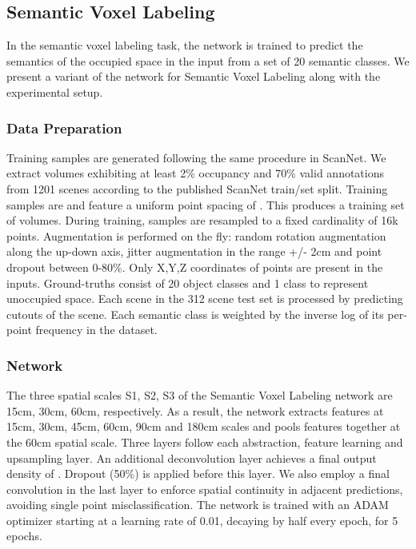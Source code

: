 \documentclass[runningheads]{llncs}
\begin{document}
\subsection{Semantic Voxel Labeling}
\label{section:EvalSVL}

In the semantic voxel labeling task, the network is trained to predict the semantics of the occupied space in the input from a set of 20 semantic classes. We present a variant of the network for Semantic Voxel Labeling along with the experimental setup. 

\subsubsection{Data Preparation}

Training samples are generated following the same procedure in ScanNet. We extract volumes exhibiting at least 2\% occupancy and 70\% valid annotations from 1201 scenes according to the published ScanNet train/set split. Training samples are  and feature a uniform point spacing of . This produces a training set of  volumes. During training, samples are resampled to a fixed cardinality of 16k points. Augmentation is performed on the fly: random rotation augmentation along the up-down axis, jitter augmentation in the range +/- 2cm and point dropout between 0-80\%. Only X,Y,Z coordinates of points are present in the inputs. Ground-truths consist of 20 object classes and 1 class to represent unoccupied space. Each scene in the 312 scene test set is processed by predicting  cutouts of the scene. Each semantic class is weighted by the inverse log of its per-point frequency in the dataset.

\subsubsection{Network}

The three spatial scales S1, S2, S3 of the Semantic Voxel Labeling network are 15cm, 30cm, 60cm, respectively. As a result, the network extracts features at 15cm, 30cm, 45cm, 60cm, 90cm and 180cm scales and pools features together at the 60cm spatial scale. Three  layers follow each abstraction, feature learning and upsampling layer. An additional deconvolution layer achieves a final output density of . Dropout (50\%) is applied before this layer. We also employ a final  convolution in the last layer to enforce spatial continuity in adjacent predictions, avoiding single point misclassification. The network is trained with an ADAM optimizer starting at a learning rate of 0.01, decaying by half every epoch, for 5 epochs.
\end{document}
